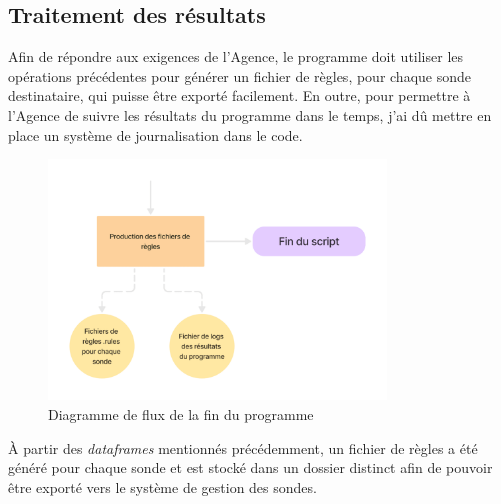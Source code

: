 \newpage

\subsection{Traitement des résultats}

\vspace{1em}

Afin de répondre aux exigences de l'Agence, le programme doit utiliser les opérations précédentes pour générer un fichier de règles, pour chaque sonde destinataire, qui puisse être exporté facilement. En outre, pour permettre à l'Agence de suivre les résultats du programme dans le temps, j'ai dû mettre en place un système de journalisation dans le code.

\begin{figure}[h]%
    \center%
    \includegraphics[width=0.8\textwidth]{assets/diagrameFlux3-5.png}
    \caption[Diagramme de flux de la fin du programme]{Diagramme de flux de la fin du programme}\label{fig:diagrameFlux3-5}
\end{figure}

\vspace{1em}

À partir des \textit{dataframes} mentionnés précédemment, un fichier de règles a été généré pour chaque sonde et est stocké dans un dossier distinct afin de pouvoir être exporté vers le système de gestion des sondes.\\

\newpage

